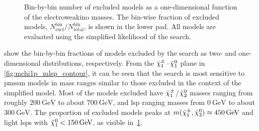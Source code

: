\begin{figure}
\begin{subfigure}[b]{0.5\linewidth}
	\end{subfigure}\hfill
	\caption{Bin-by-bin number of excluded models as a one-dimensional function of the electroweakino masses. The bin-wise fraction of excluded models, $N^\mathrm{bin}_\mathrm{excl} / N^\mathrm{bin}_\mathrm{total}$, is shown in the lower pad. All models are evaluated using the simplified likelihood of the \onelepton search.}
	\label{fig:impact_electroweakinos_1D}
\end{figure}

 show the bin-by-bin fractions of models excluded by the \onelepton search as two- and one-dimensional distributions, respectively. From the $\tilde{\chi}_1^\pm$--$\tilde{\chi}_1^0$ plane in \cref{fig:mchi1p_mlsp_contour}, it can be seen that the \onelepton search is most sensitive to \gls{pmssm} models in mass ranges similar to those excluded in the context of the simplified model. Most of the models excluded have $\tilde{\chi}_1^\pm$/$\tilde{\chi}_2^0$ masses ranging from roughly $\SI{200}{\GeV}$ to about $\SI{700}{\GeV}$, and \gls{lsp} ranging masses from $\SI{0}{\GeV}$ to about $\SI{300}{\GeV}$. The proportion of excluded models peaks at $m(\charg,\neutr) \approx \SI{450}{\GeV}$ and light \glspl{lsp} with $\lsp < \SI{150}{\GeV}$, as visible in~\cref{fig:impact_electroweakinos_1D}. 


